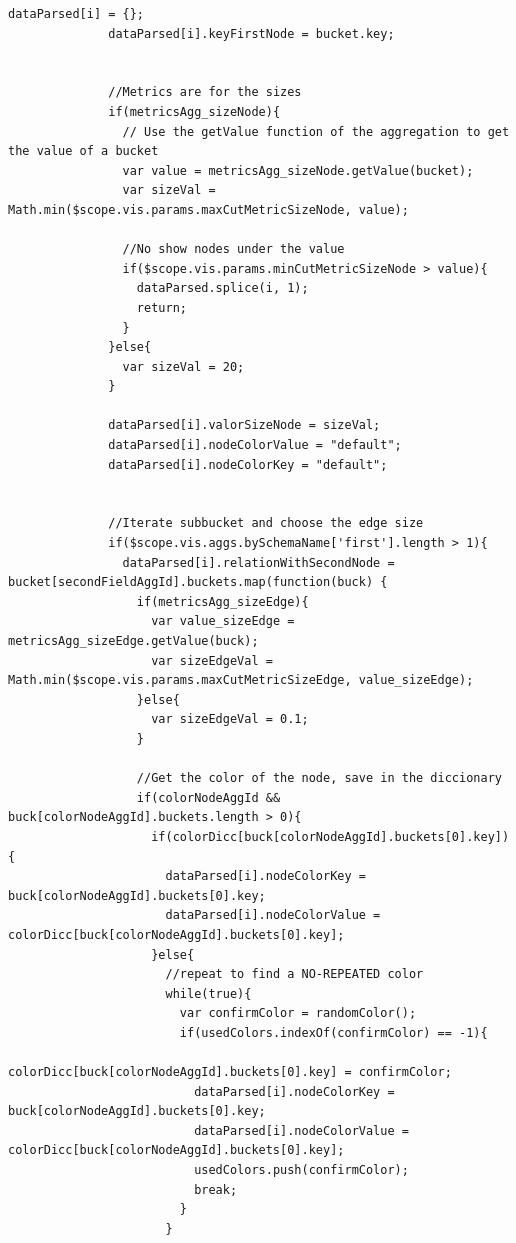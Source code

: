 \documentclass[a4paper, 12pt]{book}
\begin{document}
\begin{lstlisting}[frame=single]
              dataParsed[i] = {};
              dataParsed[i].keyFirstNode = bucket.key;


              //Metrics are for the sizes
              if(metricsAgg_sizeNode){
                // Use the getValue function of the aggregation to get the value of a bucket
                var value = metricsAgg_sizeNode.getValue(bucket);
                var sizeVal = Math.min($scope.vis.params.maxCutMetricSizeNode, value);

                //No show nodes under the value
                if($scope.vis.params.minCutMetricSizeNode > value){
                  dataParsed.splice(i, 1);
                  return;
                }
              }else{
                var sizeVal = 20;
              }

              dataParsed[i].valorSizeNode = sizeVal;
              dataParsed[i].nodeColorValue = "default";
              dataParsed[i].nodeColorKey = "default";


              //Iterate subbucket and choose the edge size
              if($scope.vis.aggs.bySchemaName['first'].length > 1){
                dataParsed[i].relationWithSecondNode = bucket[secondFieldAggId].buckets.map(function(buck) {
                  if(metricsAgg_sizeEdge){
                    var value_sizeEdge = metricsAgg_sizeEdge.getValue(buck);
                    var sizeEdgeVal = Math.min($scope.vis.params.maxCutMetricSizeEdge, value_sizeEdge);
                  }else{
                    var sizeEdgeVal = 0.1;
                  }

                  //Get the color of the node, save in the diccionary
                  if(colorNodeAggId && buck[colorNodeAggId].buckets.length > 0){
                    if(colorDicc[buck[colorNodeAggId].buckets[0].key]){
                      dataParsed[i].nodeColorKey = buck[colorNodeAggId].buckets[0].key;
                      dataParsed[i].nodeColorValue = colorDicc[buck[colorNodeAggId].buckets[0].key];
                    }else{
                      //repeat to find a NO-REPEATED color
                      while(true){
                        var confirmColor = randomColor();
                        if(usedColors.indexOf(confirmColor) == -1){
                          colorDicc[buck[colorNodeAggId].buckets[0].key] = confirmColor;
                          dataParsed[i].nodeColorKey = buck[colorNodeAggId].buckets[0].key;
                          dataParsed[i].nodeColorValue = colorDicc[buck[colorNodeAggId].buckets[0].key];
                          usedColors.push(confirmColor);
                          break;
                        }
                      }


\end{lstlisting}
\end{document}
